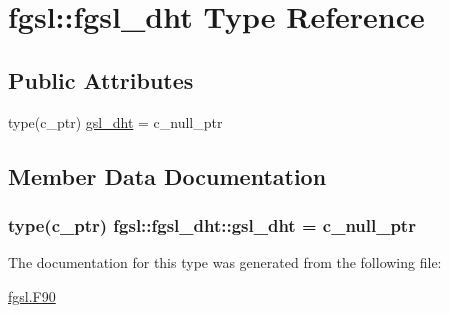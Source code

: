 \hypertarget{structfgsl_1_1fgsl__dht}{\section{fgsl\-:\-:fgsl\-\_\-dht Type Reference}
\label{structfgsl_1_1fgsl__dht}
}
\subsection*{Public Attributes}
\begin{DoxyCompactItemize}
\item 
type(c\-\_\-ptr) \hyperlink{structfgsl_1_1fgsl__dht_a969a0f8a5c2cd5e83d3f55c4f06b51c0}{gsl\-\_\-dht} = c\-\_\-null\-\_\-ptr
\end{DoxyCompactItemize}


\subsection{Member Data Documentation}
\hypertarget{structfgsl_1_1fgsl__dht_a969a0f8a5c2cd5e83d3f55c4f06b51c0}{
\subsubsection[{gsl\-\_\-dht}]{\setlength{\rightskip}{0pt plus 5cm}type(c\-\_\-ptr) fgsl\-::fgsl\-\_\-dht\-::gsl\-\_\-dht = c\-\_\-null\-\_\-ptr}}\label{structfgsl_1_1fgsl__dht_a969a0f8a5c2cd5e83d3f55c4f06b51c0}


The documentation for this type was generated from the following file\-:\begin{DoxyCompactItemize}
\item 
\hyperlink{fgsl_8F90}{fgsl.\-F90}\end{DoxyCompactItemize}
